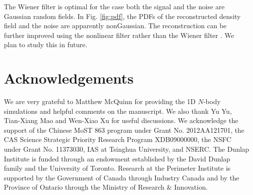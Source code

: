 \documentclass[aps,prd,twocolumn,showpacs,superscriptaddress,groupedaddress,nofootinbib]{revtex4}  %
\begin{document}
The Wiener filter is optimal for the case both the signal and the noise are
Gaussian random fields. In Fig. \ref{fig:pdf}, the PDFs of the reconstructed
density field and the noise are apparently nonGaussian.
The reconstruction can be further improved using the nonlinear filter
rather than the Wiener filter \cite{1999RSPTA.357.2561P}.
We plan to study this in future.

\section{Acknowledgements}
We are very grateful to Matthew McQuinn for providing the 1D $N$-body 
simulations and helpful comments on the manuscript.
We also thank Yu Yu, Tian-Xiang Mao and Wen-Xiao Xu for useful discussions.
We acknowledge the support of the Chinese MoST 863 program under Grant 
No. 2012AA121701, the CAS Science Strategic Priority Research Program 
XDB09000000, the NSFC under Grant No. 11373030, IAS at Tsinghua University, 
 and NSERC.
The Dunlap Institute is funded through an endowment established by the David Dunlap family and the University of Toronto.
Research at the Perimeter Institute is supported by the Government of Canada
through Industry Canada and by the Province of Ontario through the Ministry of
Research $\&$ Innovation.



\end{document}
